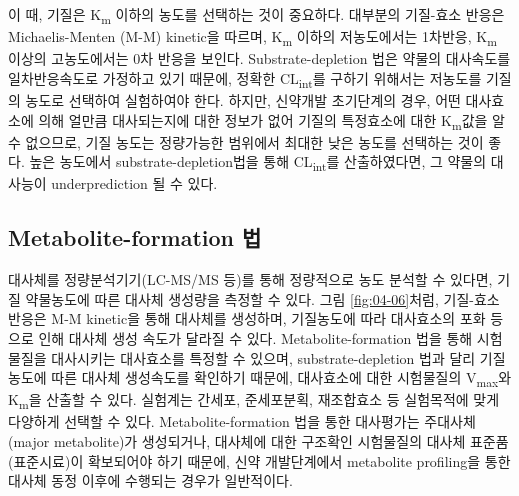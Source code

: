 \documentclass[
  11pt,
  krantz2, a4paper, twoside]{krantz}
\begin{document}
이 때, 기질은 K\textsubscript{m} 이하의 농도를 선택하는 것이 중요하다. 대부분의
기질-효소 반응은 Michaelis-Menten (M-M) kinetic을 따르며, K\textsubscript{m} 이하의
저농도에서는 1차반응, K\textsubscript{m} 이상의 고농도에서는 0차 반응을 보인다.
Substrate-depletion 법은 약물의 대사속도를 일차반응속도로 가정하고 있기
때문에, 정확한 CL\textsubscript{int}를 구하기 위해서는 저농도를 기질의 농도로 선택하여
실험하여야 한다. 하지만, 신약개발 초기단계의 경우, 어떤 대사효소에 의해
얼만큼 대사되는지에 대한 정보가 없어 기질의 특정효소에 대한 K\textsubscript{m}값을 알
수 없으므로, 기질 농도는 정량가능한 범위에서 최대한 낮은 농도를 선택하는
것이 좋다. 높은 농도에서 substrate-depletion법을 통해 CL\textsubscript{int}를
산출하였다면, 그 약물의 대사능이 underprediction 될 수 있다.

\subsection{Metabolite-formation 법}\label{metabolite-formation-uxbc95}

대사체를 정량분석기기(LC-MS/MS 등)를 통해 정량적으로 농도 분석할 수
있다면, 기질 약물농도에 따른 대사체 생성량을 측정할 수 있다. 그림 \ref{fig:04-06}처럼, 기질-효소 반응은 M-M kinetic을 통해 대사체를 생성하며,
기질농도에 따라 대사효소의 포화 등으로 인해 대사체 생성 속도가 달라질 수
있다. Metabolite-formation 법을 통해 시험물질을 대사시키는 대사효소를
특정할 수 있으며, substrate-depletion 법과 달리 기질 농도에 따른 대사체
생성속도를 확인하기 때문에, 대사효소에 대한 시험물질의 V\textsubscript{max}와 K\textsubscript{m}을
산출할 수 있다. 실험계는 간세포, 준세포분획, 재조합효소 등 실험목적에
맞게 다양하게 선택할 수 있다. Metabolite-formation 법을 통한 대사평가는
주대사체(major metabolite)가 생성되거나, 대사체에 대한 구조확인
시험물질의 대사체 표준품(표준시료)이 확보되어야 하기 때문에, 신약
개발단계에서 metabolite profiling을 통한 대사체 동정 이후에 수행되는
경우가 일반적이다.
\end{document}
